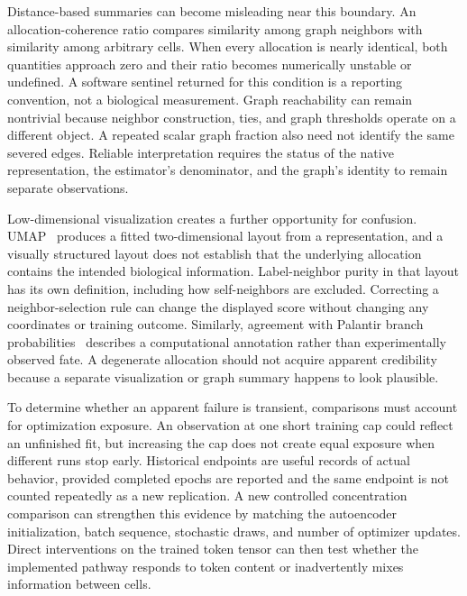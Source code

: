 Distance-based summaries can become misleading near this boundary. An allocation-coherence ratio compares similarity among graph neighbors with similarity among arbitrary cells. When every allocation is nearly identical, both quantities approach zero and their ratio becomes numerically unstable or undefined. A software sentinel returned for this condition is a reporting convention, not a biological measurement. Graph reachability can remain nontrivial because neighbor construction, ties, and graph thresholds operate on a different object. A repeated scalar graph fraction also need not identify the same severed edges. Reliable interpretation requires the status of the native representation, the estimator's denominator, and the graph's identity to remain separate observations.

Low-dimensional visualization creates a further opportunity for confusion. UMAP~\cite{mcinnes2018umap} produces a fitted two-dimensional layout from a representation, and a visually structured layout does not establish that the underlying allocation contains the intended biological information. Label-neighbor purity in that layout has its own definition, including how self-neighbors are excluded. Correcting a neighbor-selection rule can change the displayed score without changing any coordinates or training outcome. Similarly, agreement with Palantir branch probabilities~\cite{setty2019palantir} describes a computational annotation rather than experimentally observed fate. A degenerate allocation should not acquire apparent credibility because a separate visualization or graph summary happens to look plausible.

To determine whether an apparent failure is transient, comparisons must account for optimization exposure. An observation at one short training cap could reflect an unfinished fit, but increasing the cap does not create equal exposure when different runs stop early. Historical endpoints are useful records of actual behavior, provided completed epochs are reported and the same endpoint is not counted repeatedly as a new replication. A new controlled concentration comparison can strengthen this evidence by matching the autoencoder initialization, batch sequence, stochastic draws, and number of optimizer updates. Direct interventions on the trained token tensor can then test whether the implemented pathway responds to token content or inadvertently mixes information between cells.

